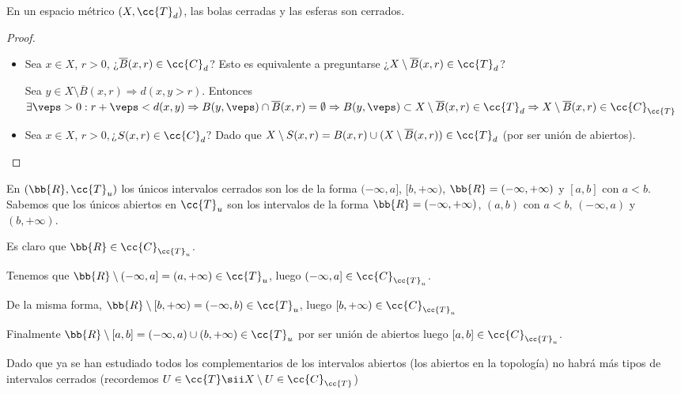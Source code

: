 \begin{ejemplo} En un espacio métrico $(X, \cc{T}_d)$, las bolas cerradas y las esferas son cerrados.
    \begin{proof}\
        \begin{itemize}
            \item Sea $x\in X$, $r>0$, ¿$\overline{B}(x,r)\in \cc{C}_d$? Esto es equivalente a preguntarse ¿$X\setminus \overline{B}(x,r) \in \cc{T}_d$?
            
            Sea $y \in X\setminus\overline{B}(x,r) \Rightarrow d(x,y>r)$. Entonces $\exists \veps >0 : r+\veps < d(x,y)\Rightarrow B(y,\veps)\cap \overline{B}(x,r)=\emptyset \Rightarrow B(y,\veps)\subset X\setminus \overline{B}(x,r)\in \cc{T}_d \Rightarrow X\setminus \overline{B}(x,r)\in \cc{C}_{\cc{T}}$

            \item Sea $x\in X$, $r>0, $¿$S(x,r)\in \cc{C}_d$? Dado que $X\setminus S(x,r)=B(x,r)\cup (X\setminus \overline{B}(x,r))\in \cc{T}_d$ (por ser unión de abiertos).
        \end{itemize}
    \end{proof}
\end{ejemplo}

\begin{ejercicio}
    En $(\bb{R},\cc{T}_u)$ los únicos intervalos cerrados son los de la forma $(-\infty, a]$, $[b, +\infty)$, $\bb{R}=(-\infty, +\infty)$ y $[a,b]$ con $a<b$.\\

    Sabemos que los únicos abiertos en $\cc{T}_u$ son los intervalos de la forma $\bb{R}=(-\infty, +\infty)$, $(a,b)$ con $a<b$, $(-\infty, a)$ y $(b, +\infty)$.

    Es claro que $\bb{R}\in \cc{C}_{\cc{T}_u}$. 
    
    Tenemos que $\bb{R}\setminus(-\infty,a] = (a,+\infty)\in \cc{T}_u$, luego $(-\infty,a]\in \cc{C}_{\cc{T}_u}$. 
    
    De la misma forma, $\bb{R}\setminus[b,+\infty) = (-\infty,b)\in \cc{T}_u$, luego $[b,+\infty)\in \cc{C}_{\cc{T}_u}$

    Finalmente $\bb{R}\setminus [a,b]=(-\infty,a)\cup(b,+\infty)\in \cc{T}_u$ por ser unión de abiertos luego $[a,b]\in \cc{C}_{\cc{T}_u}$.

    Dado que ya se han estudiado todos los complementarios de los intervalos abiertos (los abiertos en la topología) no habrá más tipos de intervalos cerrados (recordemos $U\in \cc{T}\sii X\setminus U \in \cc{C}_{\cc{T}}$)

    \endsquare
\end{ejercicio}

